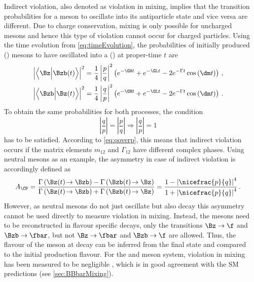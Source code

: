 Indirect \CP violation, also denoted as \CP violation in mixing, implies that the transition probabilities for a meson \Paz to oscillate into its antiparticle state \Pazb and vice versa are different.
Due to charge conservation, mixing is only possible for uncharged mesons and hence this type of \CP violation cannot occur for charged particles.
Using the time evolution from \cref{eq:timeEvolution}, the probabilities of \eg initially produced \Bz (\Bzb) mesons to have oscillated into a \Bzb (\Bz) at proper-time $t$ are
\begin{align}
\left|\left<\Bz\Big|\Bzb\!\left(t\right)\right>\right|^2=\frac{1}{4}\left|\frac{p}{q}\right|^2
\left(e^{-\GH t}+e^{-\GL t}-2e^{-\Gamma t}\cos\left(\dm t\right)\right)\,,\\
\left|\left<\Bzb\Big|\Bz\!\left(t\right)\right>\right|^2=\frac{1}{4}\left|\frac{q}{p}\right|^2
\left(e^{-\GH t}+e^{-\GL t}-2e^{-\Gamma t}\cos\left(\dm t\right)\right)\,.
\end{align}
To obtain the same probabilities for both processes, the condition
\begin{equation}
\left|\frac{q}{p}\right|=\left|\frac{p}{q}\right| \Rightarrow \left|\frac{q}{p}\right|=1
\end{equation}
has to be satisfied.
According to \cref{eq:qoverp}, this means that indirect \CP violation occurs if the matrix elements $m_{12}$ and $\Gamma_{12}$ have different complex phases.
Using neutral \B mesons as an example, the \CP asymmetry in case of indirect \CP violation is accordingly defined as
\begin{equation}
A_{\CP}=\frac{\Gamma\left(\Bz(t)\!\to\Bzb\right) - \Gamma\left(\Bzb(t)\!\to\Bz\right)}{\Gamma\left(\Bz(t)\!\to\Bzb\right) + \Gamma\left(\Bzb(t)\!\to\Bz\right)}
= \frac{1-\left|\nicefrac{p}{q}\right|^4}{1+\left|\nicefrac{p}{q}\right|^4}\,.
\end{equation}
However, as neutral \B mesons do not just oscillate but also decay this asymmetry cannot be used directly to measure \CP violation in mixing.
Instead, the \B mesons need to be reconstructed in flavour specific decays, \ie only the transitions $\Bz\to\f$ and $\Bzb\to\fbar$, but not $\Bz\to\fbar$ and $\Bzb\to\f$ are allowed.
Thus, the flavour of the meson at decay can be inferred from the final state and compared to the initial production flavour.
For the \Bz and \Bs meson system, \CP violation in mixing has been measured to be negligible \cite{HFLAV2016}, which is in good agreement with the \ac{SM} predictions (see \cref{sec:BBbarMixing}).

